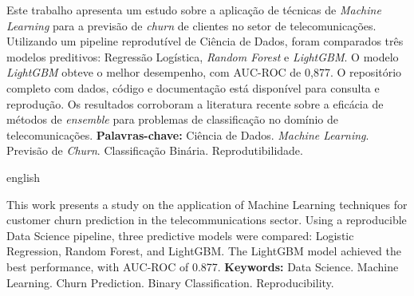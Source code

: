 \documentclass[
    12pt,
    oneside,
    a4paper,
    english,
    brazilian
    ]{abntex2}
\numberwithin{equation}{chapter}
\begin{document}
\pretextual
\maketitle
\newpage

\begin{resumo}
\noindent Este trabalho apresenta um estudo sobre a aplicação de técnicas de \textit{Machine Learning} para a previsão de \textit{churn} de clientes no setor de telecomunicações. Utilizando um pipeline reprodutível de Ciência de Dados, foram comparados três modelos preditivos: Regressão Logística, \textit{Random Forest} e \textit{LightGBM}. O modelo \textit{LightGBM} obteve o melhor desempenho, com AUC-ROC de 0,877. O repositório completo com dados, código e documentação está disponível para consulta e reprodução. Os resultados corroboram a literatura recente sobre a eficácia de métodos de \textit{ensemble} para problemas de classificação no domínio de telecomunicações.
\newline
\noindent \textbf{Palavras-chave:} Ciência de Dados. \textit{Machine Learning}. Previsão de \textit{Churn}. Classificação Binária. Reprodutibilidade.
\end{resumo}

\begin{otherlanguage*}{english}
\begin{resumo}[Abstract]
\noindent This work presents a study on the application of Machine Learning techniques for customer churn prediction in the telecommunications sector. Using a reproducible Data Science pipeline, three predictive models were compared: Logistic Regression, Random Forest, and LightGBM. The LightGBM model achieved the best performance, with AUC-ROC of 0.877.
\newline
\noindent \textbf{Keywords:} Data Science. Machine Learning. Churn Prediction. Binary Classification. Reproducibility.
\end{resumo}
\end{otherlanguage*}
\newpage

\listoffigures*
\newpage

\listoftables*
\newpage
\end{document}
